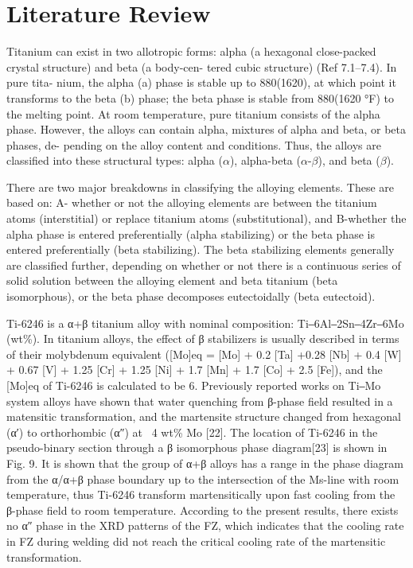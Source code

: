 \chapter{Literature Review}
\iffalse
Titanium can exist in two allotropic forms: alpha (a hexagonal close-packed crystal structure) and beta (a body-cen- tered cubic structure) (Ref 7.1–7.4). In pure tita- nium, the alpha (a) phase is stable up to 880\degC (1620\degF), at which point it transforms to the beta (b) phase; the beta phase is stable from 880\degC (1620 °F) to the melting point. At room temperature, pure titanium consists of the alpha phase. However, the alloys can contain alpha, mixtures of alpha and beta, or beta phases, de- pending on the alloy content and conditions. Thus, the alloys are classified into these structural types: alpha ($\alpha$), alpha-beta ($\alpha$-$\beta$), and beta ($\beta$).



There are two major breakdowns in classifying the alloying elements. These are based on: A- whether or not the alloying elements are between the titanium atoms (interstitial) or replace titanium atoms (substitutional), and B-whether the alpha phase is entered preferentially (alpha stabilizing) or the beta phase is entered preferentially (beta stabilizing). The beta stabilizing elements generally are classified further, depending on whether or not there is a continuous series of solid solution between the alloying element and beta titanium (beta isomorphous), or the beta phase decomposes eutectoidally (beta eutectoid).


Ti-6246 is a α+β titanium alloy with nominal composition: Ti‒6Al‒2Sn‒4Zr‒6Mo (wt\%). In titanium alloys, the effect of β stabilizers is usually described in terms of their molybdenum equivalent ([Mo]eq = [Mo] + 0.2 [Ta] +0.28 [Nb] + 0.4 [W] + 0.67 [V] + 1.25 [Cr] + 1.25 [Ni] + 1.7 [Mn] + 1.7 [Co] + 2.5 [Fe]), and the [Mo]eq of Ti-6246 is calculated to be 6. Previously reported works on Ti‒Mo system alloys have shown that water quenching from β-phase field resulted in a matensitic transformation, and the martensite structure changed from hexagonal (α′) to orthorhombic (α″) at ~4 wt\% Mo [22]. The location of Ti-6246 in the pseudo-binary section through
a β isomorphous phase diagram[23] is shown in Fig. 9. It is shown that the group of α+β alloys has a
range in the phase diagram from the α/α+β phase boundary up to the intersection of the Ms-line
with room temperature, thus Ti-6246 transform martensitically upon fast cooling from the β-phase
field to room temperature. According to the present results, there exists no α″ phase in the XRD
patterns of the FZ, which indicates that the cooling rate in FZ during welding did not reach the
critical cooling rate of the martensitic transformation.

